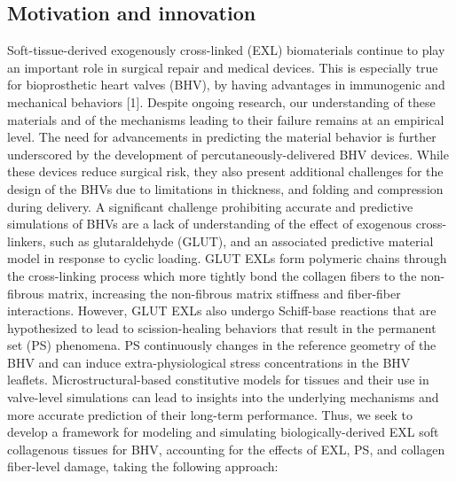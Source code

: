 \subsection{Motivation and innovation}
    Soft-tissue-derived exogenously cross-linked (EXL) biomaterials continue to play an important role in surgical repair and medical devices. This is especially true for bioprosthetic heart valves (BHV), by having advantages in immunogenic and mechanical behaviors [1]. Despite ongoing research, our understanding of these materials and of the mechanisms leading to their failure remains at an empirical level. The need for advancements in predicting the material behavior is further underscored by the development of percutaneously-delivered BHV devices. While these devices reduce surgical risk, they also present additional challenges for the design of the BHVs due to limitations in thickness, and folding and compression during delivery. A significant challenge prohibiting accurate and predictive simulations of BHVs are a lack of understanding of the effect of exogenous cross-linkers, such as glutaraldehyde (GLUT), and an associated predictive material model in response to cyclic loading. GLUT EXLs form polymeric chains through the cross-linking process which more tightly bond the collagen fibers to the non-fibrous matrix, increasing the non-fibrous matrix stiffness and fiber-fiber interactions. However, GLUT EXLs also undergo Schiff-base reactions that are hypothesized to lead to scission-healing behaviors that result in the permanent set (PS) phenomena. PS continuously changes in the reference geometry of the BHV and can induce extra-physiological stress concentrations in the BHV leaflets. Microstructural-based constitutive models for tissues and their use in valve-level simulations can lead to insights into the underlying mechanisms and more accurate prediction of their long-term performance. Thus, we seek to develop a framework for modeling and simulating biologically-derived EXL soft collagenous tissues for BHV, accounting for the effects of EXL, PS, and collagen fiber-level damage, taking the following approach:


